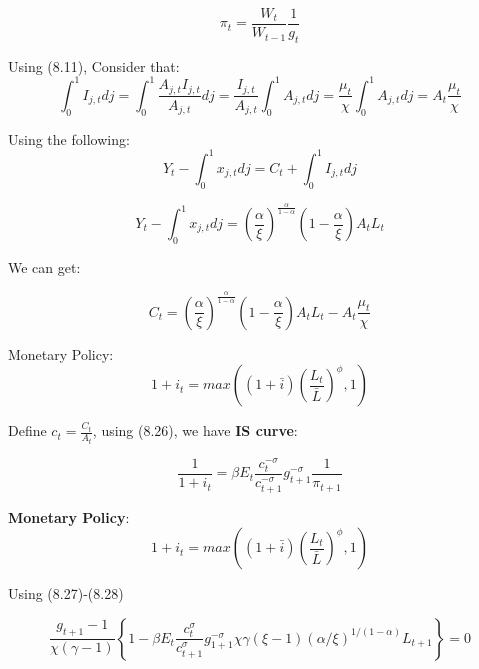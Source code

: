 \documentclass[10pt,math=newtx,citestyle=gb7714-2015,bibstyle=gb7714-2015]{elegantbook}
\begin{document}
{{{	\begin{equation}
		\pi_t =  \frac{W_t}{W_{t-1}}\frac{1}{g_t}
	\end{equation}
	
	Using (8.11), Consider that:
	$$\int_0^1 I_{j,t}dj = \int_0^1 \frac{A_{j,t}I_{j,t}}{A_{j,t}}dj =\frac{I_{j,t}}{A_{j,t}} \int_0^1 A_{j,t}dj = \frac{\mu_t}{\chi}\int_0^1 A_{j,t}dj =A_t\frac{\mu_t}{\chi}$$
	
	Using the following:
$$
		Y_t - \int_0^1 x_{j,t}dj = C_t +\int_0^1I_{j,t}dj
		$$
	
$$
		Y_t - \int_0^1 x_{j,t}dj = \left(\frac{\alpha}{\xi}\right)^{\frac{\alpha}{1-\alpha}}\left(1-\frac{\alpha}{\xi}\right)A_tL_t
	$$
	
	We can get:
	
	\begin{equation}
		C_t =  \left(\frac{\alpha}{\xi}\right)^{\frac{\alpha}{1-\alpha}}\left(1-\frac{\alpha}{\xi}\right)A_tL_t-A_t\frac{\mu_t}{\chi}
	\end{equation}
	
	
	Monetary Policy:
	\begin{equation}
		1+i_t = max \left((1+\bar{i})\left(\frac{L_t}{\bar{L}}\right)^\phi,1\right)
		\end{equation}
	
	Define $c_t = \frac{C_t}{A_t}$, using (8.26), we have \textbf{IS curve}:
	
	\begin{equation}
			\frac{1}{1+i_t} = \beta E_t \frac{c_{t}^{-\sigma}}{c_{t+1}^{-\sigma}}g_{t+1}^{-\sigma}\frac{1}{\pi_{t+1}}
	\end{equation}

	\textbf{Monetary Policy}:
\begin{equation}
	1+i_t = max \left((1+\bar{i})\left(\frac{L_t}{\bar{L}}\right)^\phi,1\right)
\end{equation}

Using (8.27)-(8.28)

\begin{equation}
	\frac{g_{t+1}-1}{\chi(\gamma-1)}\left\{1-\beta E_t \frac{c_t^\sigma}{c_{t+1}^\sigma}g_{1+1}^{-\sigma}\chi \gamma (\xi-1)(\alpha / \xi)^{1 /(1-\alpha)} L_{t+1}\right\}=0
	\end{equation}

}}}
\end{document}

